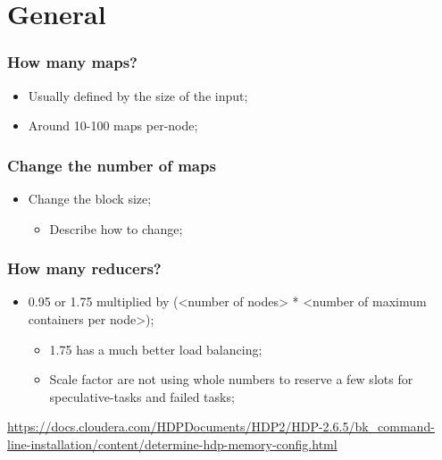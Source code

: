 \documentclass[aspectratio=169]{beamer}
\begin{document}
\section{General}

\begin{frame}
	\frametitle{How many maps?}

	\begin{itemize}
		\item Usually defined by the size of the input;
		\item Around 10-100 maps per-node;
	\end{itemize}
\end{frame}

\begin{frame}
	\frametitle{Change the number of maps}

	\begin{itemize}
		\item Change the block size;
		      \begin{itemize}
			      \item Describe how to change;
		      \end{itemize}
	\end{itemize}
\end{frame}

\begin{frame}
	\frametitle{How many reducers?}

	\begin{itemize}
		\item 0.95 or 1.75 multiplied by (<number of nodes> * <number of maximum containers per node>);
		      \begin{itemize}
			      \item 1.75 has a much better load balancing;
			      \item Scale factor are not using whole numbers to reserve a few slots for speculative-tasks and failed tasks;
		      \end{itemize}
	\end{itemize}

	\begin{center}
		{\tiny \href{https://docs.cloudera.com/HDPDocuments/HDP2/HDP-2.6.5/bk_command-line-installation/content/determine-hdp-memory-config.html}{https://docs.cloudera.com/HDPDocuments/HDP2/HDP-2.6.5/bk\_command-line-installation/content/determine-hdp-memory-config.html}}
	\end{center}
\end{frame}
\end{document}
